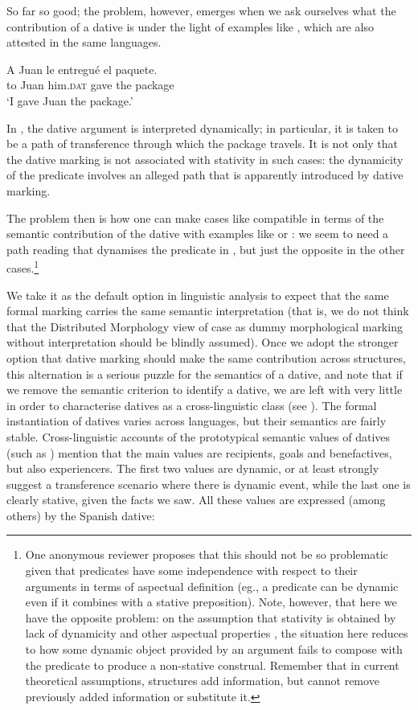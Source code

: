\documentclass[output=paper,colorlinks,citecolor=brown,nonflat]{langsci/langscibook}
\begin{document}
So far so good; the problem, however, emerges when we ask ourselves what the contribution of a dative is under the light of examples like , which are also attested in the same languages. 

\ea%
    \label{ex:fabregas:9}
    \gll    A Juan le       entregué el  paquete.\\
            {to} {Juan} {him.}\textsc{dat}   {gave}    {the} {package}\\
    \glt `I gave Juan the package.'
    \z

In , the dative argument is interpreted dynamically; in particular, it is taken to be a path of transference through which the package travels. It is not only that the dative marking is not associated with stativity in such cases: the dynamicity of the predicate involves an alleged path that is apparently introduced by dative marking.

The problem then is how one can make cases like  compatible in terms of the semantic contribution of the dative with examples like  or : we seem to need a path reading that dynamises the predicate in , but just the opposite in the other cases.\footnote{One anonymous reviewer proposes that this should not be so problematic given that predicates have some independence with respect to their arguments in terms of aspectual definition (eg., a predicate can be dynamic even if it combines with a stative preposition). Note, however, that here we have the opposite problem: on the assumption that stativity is obtained by lack of dynamicity and other aspectual properties \citet{JaqueHidalgo2014}, the situation here reduces to how some dynamic object provided by an argument fails to compose with the predicate to produce a non-stative construal. Remember that in current theoretical assumptions, structures add information, but cannot remove previously added information or substitute it.} 

We take it as the default option in linguistic analysis to expect that the same formal marking carries the same semantic interpretation (that is, we do not think that the Distributed Morphology view of case as dummy morphological marking without interpretation should be blindly assumed). Once we adopt the stronger option that dative marking should make the same contribution across structures, this alternation is a serious puzzle for the semantics of a dative, and note that if we remove the semantic criterion to identify a dative, we are left with very little in order to characterise datives as a cross-linguistic class (see ). The formal instantiation of datives varies across languages, but their semantics are fairly stable. Cross-linguistic accounts of the prototypical semantic values of datives (such as \citealt{Næss2009}) mention that the main values are recipients, goals and benefactives, but also experiencers. The first two values are dynamic, or at least strongly suggest a transference scenario where there is dynamic event, while the last one is clearly stative, given the facts we saw. All these values are expressed (among others) by the Spanish dative:
\end{document}
